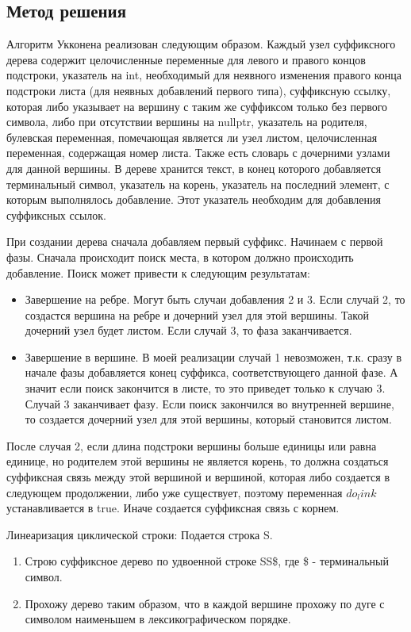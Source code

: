 \documentclass[12pt]{article}
\begin{document}
\subsection*{Метод решения}

Алгоритм Укконена реализован следующим образом. Каждый узел суффиксного дерева содержит целочисленные переменные для левого и правого концов подстроки, указатель на int, необходимый для неявного изменения правого конца подстроки листа (для неявных добавлений первого типа), суффиксную ссылку, которая либо указывает на вершину с таким же суффиксом только без первого символа, либо при отсутствии вершины на nullptr, указатель на родителя, булевская переменная, помечающая является ли узел листом, целочисленная переменная, содержащая номер листа. Также есть словарь с дочерними узлами для данной вершины. В дереве хранится текст, в конец которого добавляется терминальный символ, указатель на корень, указатель на последний элемент, с которым выполнялось добавление. Этот указатель необходим для добавления суффиксных ссылок.

При создании дерева сначала добавляем первый суффикс. Начинаем с первой фазы. Сначала происходит поиск места, в котором должно происходить добавление. Поиск может привести к следующим результатам:

\begin{itemize}
    \item Завершение на ребре. Могут быть случаи добавления 2 и 3. Если случай 2, то создастся вершина на ребре и дочерний узел для этой вершины. Такой дочерний узел будет листом. Если случай 3, то фаза заканчивается.
    \item Завершение в вершине. В моей реализации случай 1 невозможен, т.к. сразу в начале фазы добавляется конец суффикса, соответствующего данной фазе. А значит если поиск закончится в листе, то это приведет только к случаю 3. Случай 3 заканчивает фазу. Если поиск закончился во внутренней вершине, то создается дочерний узел для этой вершины, который становится листом.
\end{itemize}

После случая 2, если длина подстроки вершины больше единицы или равна единице, но родителем этой вершины не является корень, то должна создаться суффиксная связь между этой вершиной и вершиной, которая либо создается в следующем продолжении, либо уже существует, поэтому переменная 
$do_link$ устанавливается в true. Иначе создается суффиксная связь с корнем.

Линеаризация циклической строки:
Подается строка S.
\begin{enumerate}
    \item Строю суффиксное дерево по удвоенной строке SS\$, где \$ - терминальный символ.
    \item Прохожу дерево таким образом, что в каждой вершине прохожу по дуге с символом наименьшем в лексикографическом порядке.
\end{enumerate}
\end{document}
